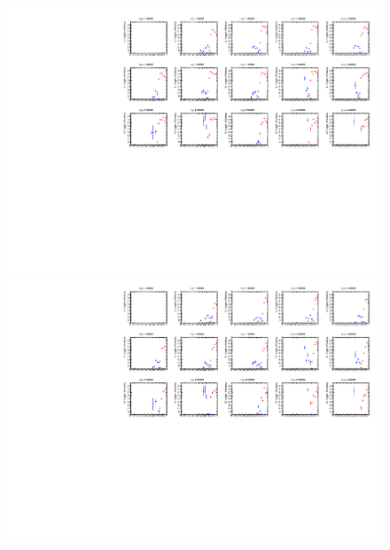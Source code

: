 \begin{figure}[tbp]
    \begin{minipage}{0.49\hsize}
    \centering   
    \includegraphics[width=\textwidth,page=16]{img/rec/stau_600_ori.pdf}
    \subcaption{}
    \end{minipage}
    \begin{minipage}{0.49\hsize}
    \centering   
    \includegraphics[width=\textwidth,page=16]{img/rec/stau_600.pdf}
    \subcaption{}
    \end{minipage}\\
    \begin{minipage}{0.49\hsize}
    \centering   

\end{minipage}
\end{figure}
